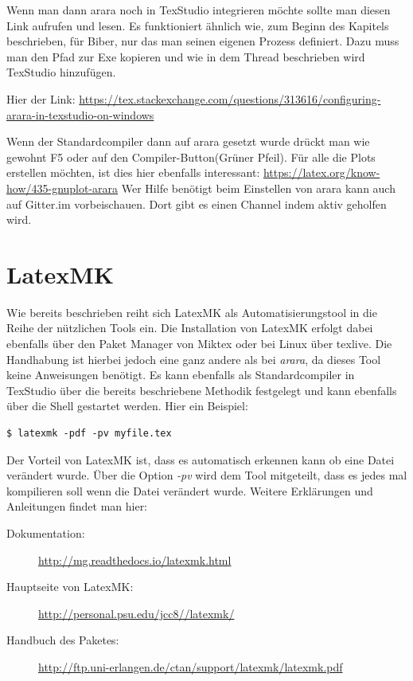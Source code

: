 Wenn man dann arara noch in TexStudio integrieren möchte sollte man diesen Link aufrufen und lesen. Es funktioniert ähnlich wie, zum Beginn des Kapitels beschrieben, für Biber, nur das man seinen eigenen Prozess definiert. Dazu muss man den Pfad zur Exe kopieren und wie in dem Thread beschrieben wird TexStudio hinzufügen.

Hier der Link: \url{https://tex.stackexchange.com/questions/313616/configuring-arara-in-texstudio-on-windows}

Wenn der Standardcompiler dann auf arara gesetzt wurde drückt man wie gewohnt F5 oder auf den Compiler-Button(Grüner Pfeil).
Für alle die Plots erstellen möchten, ist dies hier ebenfalls interessant: \url{https://latex.org/know-how/435-gnuplot-arara}
Wer Hilfe benötigt beim Einstellen von arara kann auch auf Gitter.im vorbeischauen. Dort gibt es einen Channel indem aktiv geholfen wird. 
\section{LatexMK}
Wie bereits beschrieben reiht sich LatexMK als Automatisierungstool in die Reihe der nützlichen Tools ein. Die Installation von LatexMK erfolgt dabei ebenfalls über den Paket Manager von Miktex oder bei Linux über texlive. Die Handhabung ist hierbei jedoch eine ganz andere als bei \emph{arara}, da dieses Tool keine Anweisungen benötigt. Es kann ebenfalls als Standardcompiler in TexStudio über die bereits beschriebene Methodik festgelegt und kann ebenfalls über die Shell gestartet werden. Hier ein Beispiel: 

\begin{lstlisting}[style=Bash]
$ latexmk -pdf -pv myfile.tex
\end{lstlisting}

Der Vorteil von LatexMK ist, dass es automatisch erkennen kann ob eine Datei verändert wurde. Über die Option \emph{-pv} wird dem Tool mitgeteilt, dass es jedes mal kompilieren soll wenn die Datei verändert wurde. Weitere Erklärungen und Anleitungen findet man hier:
\begin{description}
	\item[Dokumentation: ] \url{http://mg.readthedocs.io/latexmk.html}
	\item[Hauptseite von LatexMK: ] \url{http://personal.psu.edu/jcc8//latexmk/}
	\item[Handbuch des Paketes: ] \url{http://ftp.uni-erlangen.de/ctan/support/latexmk/latexmk.pdf}
\end{description}

